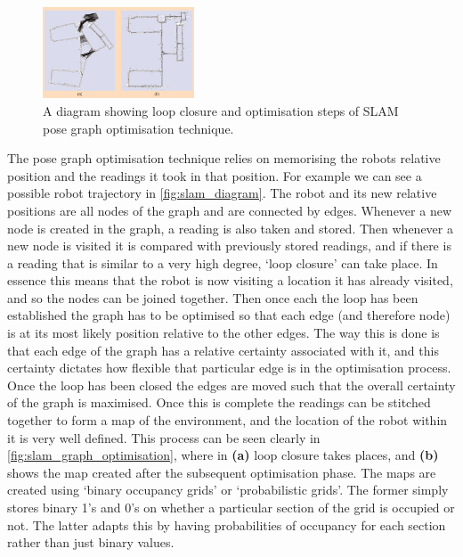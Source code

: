 \begin{figure}[htb]
      \centering
      \includegraphics[width=0.4\textwidth]{background/images/slam_graph_optimisation.png}
      \caption{A diagram showing loop closure and optimisation steps of SLAM pose graph optimisation technique\cite{PoseGraphOptimisation}.}
      \label{fig:slam_graph_optimisation}
\end{figure}

The pose graph optimisation technique relies on memorising the robots relative position and the readings it took in that position. For example we can see a possible robot trajectory in \autoref{fig:slam_diagram}. The robot and its new relative positions are all nodes of the graph and are connected by edges. Whenever a new node is created in the graph, a reading is also taken and stored. Then whenever a new node is visited it is compared with previously stored readings, and if there is a reading that is similar to a very high degree, `loop closure' can take place. In essence this means that the robot is now visiting a location it has already visited, and so the nodes can be joined together. Then once each the loop has been established the graph has to be optimised so that each edge (and therefore node) is at its most likely position relative to the other edges. The way this is done is that each edge of the graph has a relative certainty associated with it, and this certainty dictates how flexible that particular edge is in the optimisation process. Once the loop has been closed the edges are moved such that the overall certainty of the graph is maximised. Once this is complete the readings can be stitched together to form a map of the environment, and the location of the robot within it is very well defined. This process can be seen clearly in \autoref{fig:slam_graph_optimisation}, where in \textbf{(a)} loop closure takes places, and \textbf{(b)} shows the map created after the subsequent optimisation phase. The maps are created using `binary occupancy grids' or `probabilistic grids'. The former simply stores binary 1's and 0's on whether a particular section of the grid is occupied or not. The latter adapts this by having probabilities of occupancy for each section rather than just binary values.

